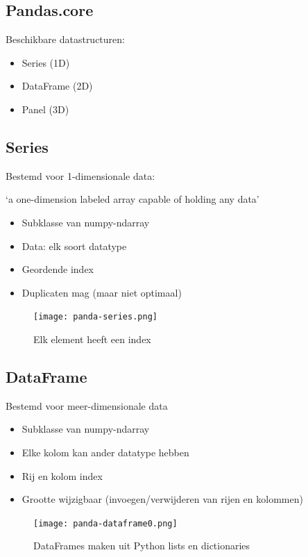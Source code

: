 \documentclass{article}
\begin{document}
\subsection{Pandas.core}

Beschikbare datastructuren:

\begin{itemize}
    \item Series (1D)
    \item DataFrame (2D)
    \item Panel (3D)
\end{itemize}

\subsection{Series}

Bestemd voor 1-dimensionale data: 

`a one-dimension labeled array capable of holding any data'


\begin{itemize}
    \item Subklasse van numpy-ndarray
    \item Data: elk soort datatype
    \item Geordende index
    \item Duplicaten mag (maar niet optimaal)
\end{itemize}

\begin{figure}[H]
    \centering
    \texttt{[image: panda-series.png]}
    \caption{Elk element heeft een index}
\end{figure}

\subsection{DataFrame}

Bestemd voor meer-dimensionale data

\begin{itemize}
    \item Subklasse van numpy-ndarray
    \item Elke kolom kan ander datatype hebben
    \item Rij en kolom index
    \item Grootte wijzigbaar (invoegen/verwijderen van rijen en kolommen)
\end{itemize}

\begin{figure}[H]
    \centering
    \texttt{[image: panda-dataframe0.png]}
    \caption{DataFrames maken uit Python lists en dictionaries}
\end{figure}
\end{document}
